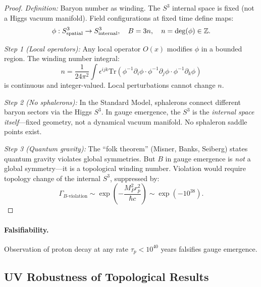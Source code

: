 \begin{proof}
\textit{Definition:} Baryon number as winding. The $S^3$ internal space is fixed 
(not a Higgs vacuum manifold). Field configurations at fixed time define maps:
\begin{equation}
\phi: S^3_{\rm spatial} \to S^3_{\rm internal}, \quad B = 3n, \quad n = \deg(\phi) \in \mathbb{Z}.
\end{equation}

\textit{Step 1 (Local operators):} Any local operator $O(x)$ modifies $\phi$ in a 
bounded region. The winding number integral:
\begin{equation}
n = \frac{1}{24\pi^2}\int \epsilon^{ijk}\text{Tr}(\phi^{-1}\partial_i\phi \cdot \phi^{-1}\partial_j\phi \cdot \phi^{-1}\partial_k\phi)
\end{equation}
is continuous and integer-valued. Local perturbations cannot change $n$.

\textit{Step 2 (No sphalerons):} In the Standard Model, sphalerons connect different 
baryon sectors via the Higgs $S^3$. In gauge emergence, the $S^3$ is the \emph{internal 
space itself}---fixed geometry, not a dynamical vacuum manifold. No sphaleron saddle 
points exist.

\textit{Step 3 (Quantum gravity):} The ``folk theorem'' (Misner, Banks, Seiberg) 
states quantum gravity violates global symmetries. But $B$ in gauge emergence is 
\emph{not} a global symmetry---it is a topological winding number. Violation would 
require topology change of the internal $S^3$, suppressed by:
\begin{equation}
\Gamma_{B\text{-violation}} \sim \exp\left(-\frac{M_P^2 r_p^2}{\hbar c}\right) \sim \exp(-10^{38}).
\end{equation}
\end{proof}

\paragraph{Falsifiability.}
Observation of proton decay at any rate $\tau_p < 10^{40}$ years falsifies gauge emergence.

\subsection{UV Robustness of Topological Results}\label{app:uv-robust}


